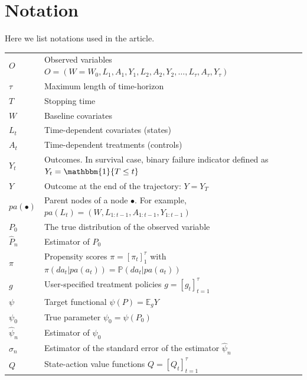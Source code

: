 \documentclass{article}
\theoremstyle{plain}
\theoremstyle{definition}
\theoremstyle{remark}
\begin{document}



\newpage
\appendix
\onecolumn

\section{Notation}

Here we list notations used in the article.

\begin{center}
\begin{tabular}{ll}
     $O$ & Observed variables $O=(W=W_0, L_1, A_1, Y_1, L_2, A_2, Y_2, \ldots, L_\tau, A_\tau, Y_\tau)$ \\
     $\tau$ & Maximum length of time-horizon \\
     $T$ & Stopping time \\
     $W$ & Baseline covariates \\
     $L_t$ & Time-dependent covariates (states) \\
     $A_t$ & Time-dependent treatments (controls) \\
     $Y_t$ & Outcomes. In survival case, binary failure indicator defined as $Y_t = \mathbbm{1}\{T\le t\}$ \\
     $Y$ & Outcome at the end of the trajectory: $Y=Y_T$ \\
     $pa(\bullet)$ & Parent nodes of a node $\bullet$. For example, $pa(L_t)=(W,L_{1:t-1}, A_{1:t-1}, Y_{1:t-1})$ \\
     $P_0$ & The true distribution of the observed variable\\
     $\hat{P}_n$ & Estimator of $P_0$ \\
     $\pi$ & Propensity scores $\pi=[\pi_t]_1^\tau$ with $\pi(da_t|pa(a_t))=\mathbb{P}(da_t|pa(a_t))$ \\
     $g$ & User-specified treatment policies $g=[g_t]_{t=1}^\tau$ \\
     $\psi$ & Target functional $\psi(P)=\mathbb{E}_gY$ \\
     $\psi_0$ & True parameter $\psi_0 = \psi(P_0)$ \\
     $\hat{\psi}_n$ & Estimator of $\psi_0$ \\
     $\hat{\sigma}_n$ & Estimator of the standard error of the estimator $\hat{\psi}_n$ \\
     $Q$ & State-action value functions $Q=[Q_t]_{t=1}^\tau$ \\

\end{tabular}
\end{center}
\end{document}
